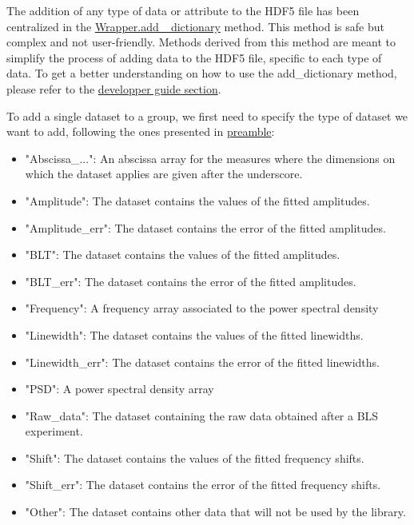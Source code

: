 The addition of any type of data or attribute to the HDF5 file has been centralized in the \hyperref[subchapter:wrapper.add_dictionary]{Wrapper.add\_ dictionary} method. This method is safe but complex and not user-friendly. Methods derived from this method are meant to simplify the process of adding data to the HDF5 file, specific to each type of data. To get a better understanding on how to use the add\_dictionary method, please refer to the \hyperref[subchapter:wrapper.add_dictionary]{developper guide section}.

To add a single dataset to a group, we first need to specify the type of dataset we want to add, following the ones presented in \hyperref[subsec:preamble.file_structure.complete_structure]{preamble}:
\begin{itemize}
    \item "Abscissa\_...": An abscissa array for the measures where the dimensions on which the dataset applies are given after the underscore.
    \item "Amplitude": The dataset contains the values of the fitted amplitudes.
    \item "Amplitude\_err": The dataset contains the error of the fitted amplitudes.
    \item "BLT": The dataset contains the values of the fitted amplitudes.
    \item "BLT\_err": The dataset contains the error of the fitted amplitudes.
    \item "Frequency": A frequency array associated to the power spectral density
    \item "Linewidth": The dataset contains the values of the fitted linewidths.
    \item "Linewidth\_err": The dataset contains the error of the fitted linewidths. 
    \item "PSD": A power spectral density array
    \item "Raw\_data": The dataset containing the raw data obtained after a BLS experiment.
    \item "Shift": The dataset contains the values of the fitted frequency shifts.
    \item "Shift\_err": The dataset contains the error of the fitted frequency shifts.
    \item "Other": The dataset contains other data that will not be used by the library.
\end{itemize}

